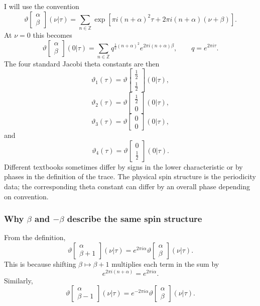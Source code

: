 \documentclass[
  10pt,
  a4paper,
  openany]{book}
\begin{document}
I will use the convention \[
\vartheta\begin{bmatrix}
\alpha\\
\beta
\end{bmatrix}(\nu|\tau)
=
\sum_{n\in\mathbb Z}
\exp\left[
\pi i(n+\alpha)^2\tau
+
2\pi i(n+\alpha)(\nu+\beta)
\right].
\] At \(\nu=0\) this becomes \[
\vartheta\begin{bmatrix}
\alpha\\
\beta
\end{bmatrix}(0|\tau)
=
\sum_{n\in\mathbb Z}
q^{\frac{1}{2}(n+\alpha)^2}
e^{2\pi i(n+\alpha)\beta},
\qquad
q=e^{2\pi i\tau}.
\] The four standard Jacobi theta constants are then \[
\vartheta_1(\tau)
=
\vartheta\begin{bmatrix}
\frac{1}{2}\\
\frac{1}{2}
\end{bmatrix}(0|\tau),
\] \[
\vartheta_2(\tau)
=
\vartheta\begin{bmatrix}
\frac{1}{2}\\
0
\end{bmatrix}(0|\tau),
\] \[
\vartheta_3(\tau)
=
\vartheta\begin{bmatrix}
0\\
0
\end{bmatrix}(0|\tau),
\] and \[
\vartheta_4(\tau)
=
\vartheta\begin{bmatrix}
0\\
\frac{1}{2}
\end{bmatrix}(0|\tau).
\] Different textbooks sometimes differ by signs in the lower
characteristic or by phases in the definition of the trace. The physical
spin structure is the periodicity data; the corresponding theta constant
can differ by an overall phase depending on convention.

\subsubsection{\texorpdfstring{Why \(\beta\) and \(-\beta\) describe the
same spin
structure}{Why \textbackslash beta and -\textbackslash beta describe the same spin structure}}\label{why-beta-and--beta-describe-the-same-spin-structure}

From the definition, \[
\vartheta\begin{bmatrix}
\alpha\\
\beta+1
\end{bmatrix}(\nu|\tau)
=
e^{2\pi i\alpha}
\vartheta\begin{bmatrix}
\alpha\\
\beta
\end{bmatrix}(\nu|\tau).
\] This is because shifting \(\beta\mapsto\beta+1\) multiplies each term
in the sum by \[
e^{2\pi i(n+\alpha)}
=
e^{2\pi i\alpha}.
\] Similarly, \[
\vartheta\begin{bmatrix}
\alpha\\
\beta-1
\end{bmatrix}(\nu|\tau)
=
e^{-2\pi i\alpha}
\vartheta\begin{bmatrix}
\alpha\\
\beta
\end{bmatrix}(\nu|\tau).
\]
\end{document}
